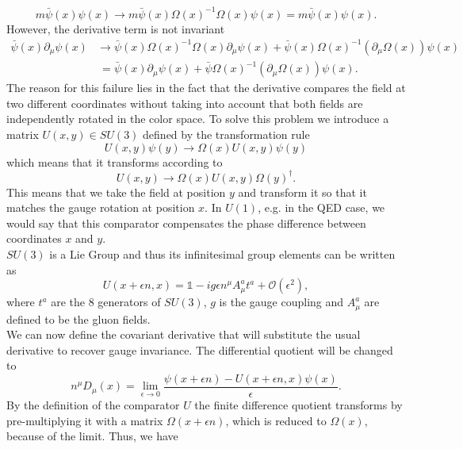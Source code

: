 \begin{equation}
    m\bar\psi(x)\psi(x)\rightarrow m\bar\psi(x)\Omega(x)^{-1}\Omega(x)\psi(x)=m\bar\psi(x)\psi(x).
\end{equation}
However, the derivative term is not invariant
\begin{align}
    \bar\psi(x)\partial_\mu\psi(x)&\rightarrow\bar\psi(x)\Omega(x)^{-1}\Omega(x)\partial_\mu\psi(x)+\bar\psi(x)\Omega(x)^{-1}\left(\partial_\mu\Omega(x)\right)\psi(x) \\
    &~=\bar\psi(x)\partial_\mu\psi(x)+\bar\psi\Omega(x)^{-1}\left(\partial_\mu\Omega(x)\right)\psi(x).
\end{align}
The reason for this failure lies in the fact that the derivative compares the field at two different coordinates without taking into account that both fields are independently rotated in the color space. To solve this problem we introduce a matrix $U(x,y)\in SU(3)$ defined by the transformation rule
\begin{equation}
    U(x,y)\psi(y)\rightarrow\Omega(x) U(x,y)\psi(y)   
\end{equation}
which means that it transforms according to
\begin{equation}
    U(x,y)\rightarrow \Omega(x)U(x,y)\Omega(y)^\dagger.
\end{equation}
This means that we take the field at position $y$ and transform it so that it matches the gauge rotation at position $x$. In $U(1)$, e.g. in the QED case, we would say that this comparator compensates the phase difference between coordinates $x$ and $y$. \\
$SU(3)$ is a Lie Group and thus its infinitesimal group elements can be written as
\begin{equation}
    U(x+\epsilon n,x)=\mathbb{1}-ig\epsilon n^\mu A_\mu^a t^a+\mathcal{O}(\epsilon^2),\label{eq:comparator1storder}
\end{equation}
where $t^a$ are the 8 generators of $SU(3)$, $g$ is the gauge coupling and $A_\mu^a$ are defined to be the gluon fields.\\
We can now define the covariant derivative that will substitute the usual derivative to recover gauge invariance. The  differential quotient will be changed to
\begin{equation}
    n^\mu D_\mu (x)= \underset{\epsilon\to0}{\lim} \frac{\psi(x+\epsilon n)-U(x+\epsilon n,x)\psi(x)}{\epsilon}.
\end{equation}
By the definition of the comparator $U$ the finite difference quotient transforms by pre-multiplying it with a matrix $\Omega(x+\epsilon n)$, which is reduced to $\Omega(x)$, because of the limit. Thus, we have
